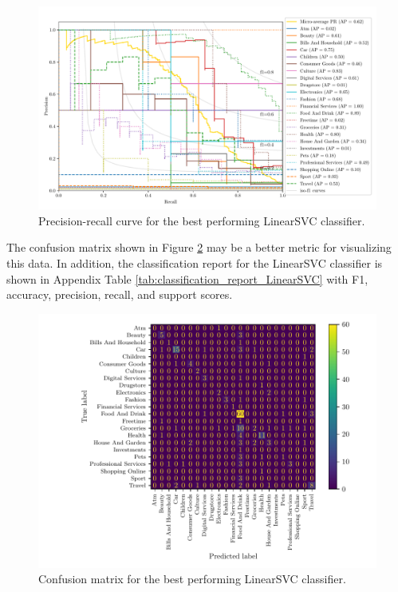 \begin{figure}[ht]
  \centering
  \includegraphics[width=\scale\textwidth]{../img/plot_pr_curve.pdf}
  \caption{Precision-recall curve for the best performing LinearSVC classifier.}
  \label{fig:pr_curve}
\end{figure}


The confusion matrix shown in Figure \ref{fig:confusion_matrix} may be a better metric for visualizing this data. In addition, the classification report for the LinearSVC classifier is shown in Appendix Table \ref{tab:classification_report_LinearSVC} with F1, accuracy, precision, recall, and support scores.

\begin{figure}[ht]
  \centering
  \includegraphics[width=\scale\textwidth]{../img/plot_cm_LinearSVC.pdf}
  \caption{Confusion matrix for the best performing LinearSVC classifier.}
  \label{fig:confusion_matrix}
\end{figure}


